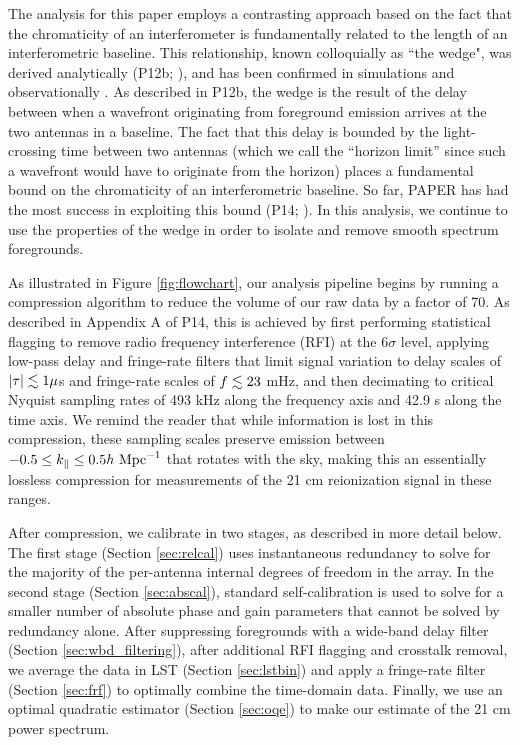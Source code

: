 \documentclass[twocolumn,numberedappendix]{emulateapj} \shorttitle{PSA64}
\newcommand{\hMpci}{h\ {\rm Mpc}^{-1}}
\begin{document}
The analysis for this paper employs a contrasting
approach based on the fact that the chromaticity of an interferometer
is fundamentally related to the length of an interferometric baseline.  This relationship, known
colloquially as ``the wedge", was 
derived analytically (P12b; \citealt{vedantham_et_al2012}), and has been confirmed in 
simulations \citep{datta_et_al2010,hazelton_et_al2013} and observationally
\citep{pober_et_al2013,dillon_et_al2013b}.  As described in P12b, the wedge is the result of the delay
between when a wavefront originating from foreground emission
arrives at the two antennas in a baseline.  The fact that this delay is bounded by the light-crossing
time between two antennas (which we call the ``horizon limit'' since such a wavefront would have to 
originate from the horizon) places a fundamental bound on the chromaticity of
an interferometric baseline.  So far, PAPER has had the most success in exploiting this bound
(P14; \citealt{jacobs_et_al2014}). 
In this analysis, we continue to use the properties of the 
wedge in order to isolate and remove smooth
spectrum foregrounds.

As illustrated in Figure \ref{fig:flowchart},
our analysis pipeline begins by running a compression
algorithm to reduce the volume of our raw data by a factor of 70.
As described in Appendix A of P14, this is achieved by first performing statistical flagging to remove
radio frequency interference (RFI) at the 6$\sigma$ level, applying low-pass delay and fringe-rate filters that limit signal variation
to delay scales of $|\tau|\lesssim1 \mu$s and fringe-rate scales of $f\lesssim23$ mHz, and then 
decimating to critical Nyquist sampling rates of 493 kHz along the frequency axis
and 42.9 s along the time axis.  We remind the reader that while information is lost in this compression,
these sampling scales preserve emission between
$-0.5\le k_\parallel\le 0.5\hMpci$ that rotates with the sky, making this an essentially lossless compression 
for measurements of the 21 cm reionization signal in these ranges.

After compression, we calibrate in two stages, as described in more detail below.  
The first stage (Section \ref{sec:relcal}) uses instantaneous redundancy to solve for the majority of the 
per-antenna internal degrees of freedom in the array.  In the second stage (Section \ref{sec:abscal}), standard self-calibration is used 
to solve for a smaller number of
absolute phase and gain parameters that cannot be solved by redundancy alone. 
After suppressing foregrounds with a
wide-band delay filter (Section \ref{sec:wbd_filtering}), after additional RFI flagging and crosstalk removal, 
we average the data in LST (Section \ref{sec:lstbin}) and apply a
fringe-rate filter (Section \ref{sec:frf}) to optimally combine the time-domain data. 
Finally, we use an
optimal quadratic estimator (Section \ref{sec:oqe}) to make our estimate of the 21 cm power spectrum.
\end{document}
